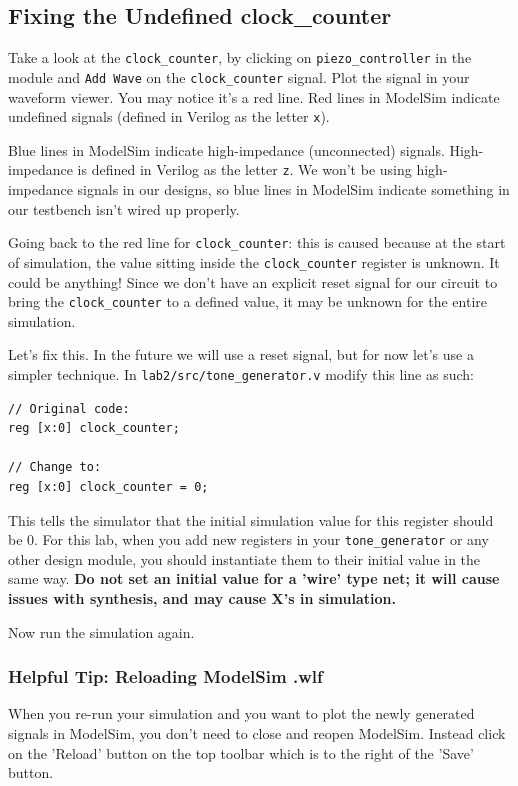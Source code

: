 \documentclass[11pt]{article}
\begin{document}
\subsection{Fixing the Undefined clock\_counter}

Take a look at the \verb|clock_counter|, by clicking on \verb|piezo_controller| in the module and \verb|Add Wave| on the \verb|clock_counter| signal. Plot the signal in your waveform viewer. You may notice it's a red line. Red lines in ModelSim indicate undefined signals (defined in Verilog as the letter \verb|x|).

Blue lines in ModelSim indicate high-impedance (unconnected) signals. High-impedance is defined in Verilog as the letter \verb|z|. We won't be using high-impedance signals in our designs, so blue lines in ModelSim indicate something in our testbench isn't wired up properly.

Going back to the red line for \verb|clock_counter|: this is caused because at the start of simulation, the value sitting inside the \verb|clock_counter| register is unknown. It could be anything! Since we don't have an explicit reset signal for our circuit to bring the \verb|clock_counter| to a defined value, it may be unknown for the entire simulation.

Let's fix this. In the future we will use a reset signal, but for now let's use a simpler technique. In \verb|lab2/src/tone_generator.v| modify this line as such:

\begin{verbatim}
// Original code:
reg [x:0] clock_counter;

// Change to:
reg [x:0] clock_counter = 0;
\end{verbatim}

This tells the simulator that the initial simulation value for this register should be 0. For this lab, when you add new registers in your \verb|tone_generator| or any other design module, you should instantiate them to their initial value in the same way. \textbf{Do not set an initial value for a 'wire' type net; it will cause issues with synthesis, and may cause X's in simulation.}

Now run the simulation again.

\subsubsection{Helpful Tip: Reloading ModelSim .wlf}

When you re-run your simulation and you want to plot the newly generated signals in ModelSim, you don't need to close and reopen ModelSim. Instead click on the 'Reload' button on the top toolbar which is to the right of the 'Save' button.
\end{document}

